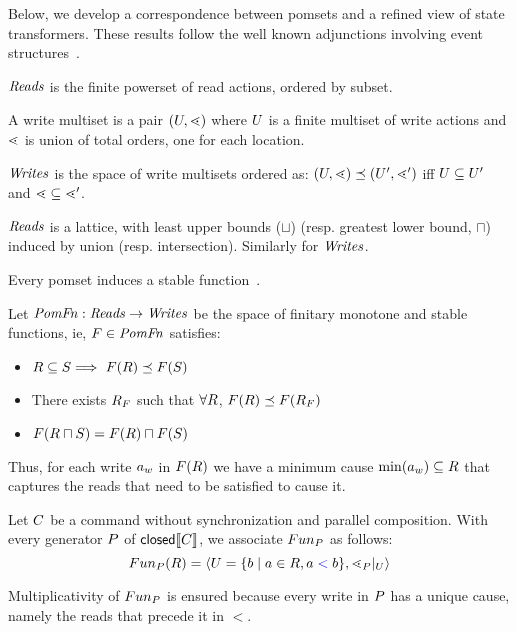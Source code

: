 Below, we develop a correspondence between pomsets and a refined view of state transformers.  These results follow the well known adjunctions involving event structures~\citet{Winskel:1995:MC:218623.218630}.  

\begin{definition}
$\mathit{Reads}$ is the finite powerset of read actions, ordered by subset.  

A write multiset is a pair $(U,\lessdot)$ where $U$ is a finite multiset of write actions and $\lessdot$ is union of total orders, one for each location. 

$\mathit{Writes}$ is the space of write multisets ordered as:
$(U,\lessdot) \preceq (U',\lessdot')$ iff $U \subseteq U'$ and $\lessdot \subseteq \lessdot'$.
\end{definition}

$\mathit{Reads}$ is a lattice, with least upper bounds ($\sqcup$) (resp. greatest lower bound, $\sqcap$)  induced by union (resp. intersection).  Similarly for $\mathit{Writes}$. 


Every pomset induces a stable function~\cite{DBLP:conf/icalp/Berry78}.  
\begin{definition}
Let $\mathit{PomFn}: \mathit{Reads} \rightarrow \mathit{Writes}$ be the space of finitary monotone and stable functions, ie, $F \in \mathit{PomFn}$ satisfies:
\begin{itemize}
\item $R \subseteq S \Longrightarrow\ F(R) \preceq F(S)$
\item There exists $R_{F}$ such that $\forall R$, $F(R) \preceq F(R_{F})$
\item $F(R \sqcap S) =  F(R) \sqcap F(S)$
\end{itemize}
\end{definition}
Thus, for each write  $a_w$ in $F(R)$ we have a minimum cause $\min(a_w) \subseteq R$ that captures the reads that need to be satisfied to cause it.   

\begin{definition}
Let $C$ be a command without synchronization and parallel composition.   With every generator $P$ of  $\textsf{closed}\llbracket C\rrbracket$, we associate $Fun_{P}$ as follows:
\[ Fun_{P}(R) = \langle U = \{ b \mid a \in R, a \mathrel{{\color{blue}<}} b \}, \lessdot_{P} \mathbin{|}_{U} \rangle \]
\end{definition}
Multiplicativity  of $Fun_{P}$ is ensured because every write in $P$ has a unique cause, namely the reads that precede it in $\lt$.

